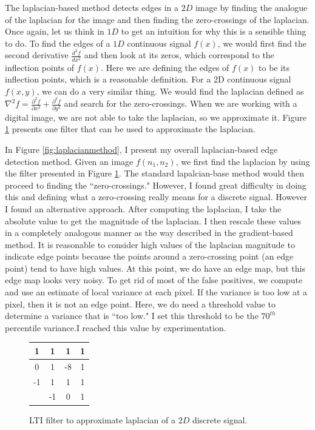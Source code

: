 \documentclass[12pt]{amsart}
\begin{document}
The laplacian-based method detects edges in a $2D$ image by finding the analogue of the laplacian for the image and then finding the zero-crossings of the laplacian. Once again, let us think in $1D$ to get an intuition for why this is a sensible thing to do. To find the edges of a $1D$ continuous signal $f(x)$, we would first find the second derivative $\frac{d^2f}{dx^2}$ and then look at its zeros, which correspond to the inflection points of $f(x)$. Here we are defining the edges of $f(x)$ to be its inflection points, which is a reasonable definition. For a 2D continuous signal $f(x,y)$, we can do a very similar thing. We would find the laplacian defined as $\nabla^2f = \frac{\partial^2f}{\partial x^2} +  \frac{\partial^2f}{\partial y^2}$ and search for the zero-crossings. When we are working with a digital image, we are not able to take the laplacian, so we approximate it. Figure \ref{fig:laplacianfilter} presents one filter that can be used to approximate the laplacian.

In Figure  \ref{fig:laplacianmethod}, I present my overall laplacian-based edge detection method. Given an image $f(n_1, n_2)$, we first find the laplacian by using the filter presented in Figure \ref{fig:laplacianfilter}. The standard lapalcian-base method would then proceed to finding the ``zero-crossings." However, I found great difficulty in doing this and defining what a zero-crossing really means for a discrete signal. However I found an alternative approach. After computing the laplacian, I take the absolute value to get the magnitude of the laplacian. I then rescale these values in a completely analogous manner as the way described in the gradient-based method. It is reasonable to consider high values of the laplacian magnitude to indicate edge points because the points around a zero-crossing point (an edge point) tend to have high values. At this point, we do have an edge map, but this edge map looks very noisy. To get rid of most of the false positives, we compute and use an estimate of local variance at each pixel. If the variance is too low at a pixel, then it is not an edge point. Here, we do need a threshold value to determine a variance that is ``too low." I set this threshold to be the $70^{th}$ percentile variance.I reached this value by experimentation.

\begin{figure}
\centering
\begin{tabular}{c || c | c | c }
{\color{light-gray}1} & 1 & 1 & 1 \\
\hline
{\color{light-gray}0} & 1 & -8 & 1 \\
\hline
{\color{light-gray}-1} & 1 & 1 & 1 \\
\hline\hline
& {\color{light-gray}-1} & {\color{light-gray}0} & {\color{light-gray}1} \\
\end{tabular}
\caption{LTI filter to approximate laplacian of a $2D$ discrete signal.}
\label{fig:laplacianfilter}
\end{figure}
\end{document}
